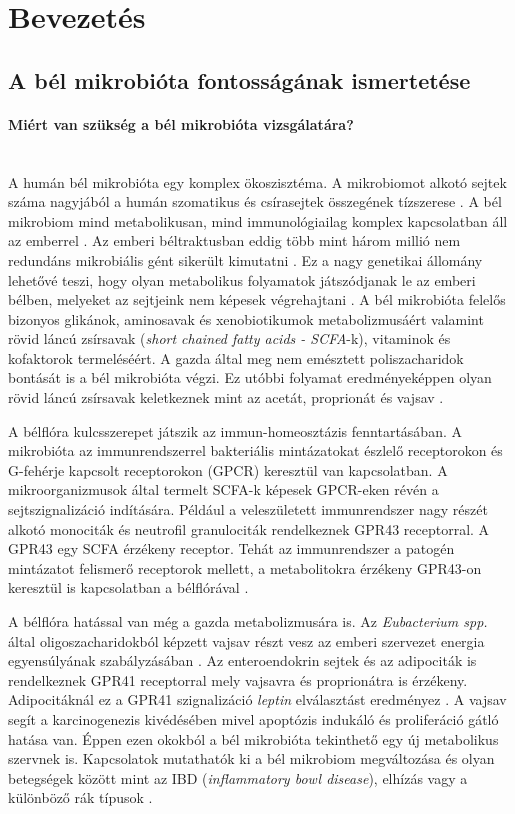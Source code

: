 \documentclass[a4paper,12pt]{article}
\begin{document}
		\pagebreak

\section{Bevezetés}
	\subsection{A bél mikrobióta fontosságának ismertetése}
		\paragraph{Miért van szükség a bél mikrobióta vizsgálatára?} \mbox{}\\
		A humán bél mikrobióta egy komplex ökoszisztéma. A mikrobiomot alkotó sejtek száma nagyjából a humán szomatikus és csírasejtek összegének tízszerese \cite{scfa_and_vitamine}.  A bél mikrobiom mind metabolikusan, mind immunológiailag komplex kapcsolatban áll az emberrel \cite{gut_microbiome}. Az emberi béltraktusban eddig több mint három millió nem redundáns mikrobiális gént sikerült kimutatni \cite{meta_omics}. Ez a nagy genetikai állomány lehetővé teszi, hogy olyan metabolikus folyamatok játszódjanak le az emberi bélben, melyeket az sejtjeink nem képesek végrehajtani \cite{gut_microbiome}. A bél mikrobióta felelős bizonyos glikánok, aminosavak és xenobiotikumok metabolizmusáért valamint rövid láncú zsírsavak (\textit{short chained fatty acids - SCFA}-k), vitaminok és kofaktorok termeléséért. A gazda által meg nem emésztett poliszacharidok bontását is a bél mikrobióta végzi. Ez utóbbi folyamat eredményeképpen olyan rövid láncú zsírsavak keletkeznek mint az acetát, proprionát és vajsav \cite{scfa_and_vitamine}.

		A bélflóra kulcsszerepet játszik az immun-homeosztázis fenntartásában. A mikrobióta az immunrendszerrel bakteriális mintázatokat észlelő receptorokon és G-fehérje kapcsolt receptorokon (GPCR) keresztül van kapcsolatban. A mikroorganizmusok által termelt SCFA-k képesek GPCR-eken révén a sejtszignalizáció indítására. Például a veleszületett immunrendszer nagy részét alkotó monociták és neutrofil granulociták rendelkeznek GPR43 receptorral. A GPR43 egy SCFA érzékeny receptor. Tehát az immunrendszer a patogén mintázatot felismerő receptorok mellett, a metabolitokra érzékeny GPR43-on keresztül is kapcsolatban a bélflórával \cite{buthyrate_immune}.

		A bélflóra hatással van még a gazda metabolizmusára is.  Az \textit{Eubacterium spp.} által oligoszacharidokból képzett vajsav részt vesz az emberi szervezet energia egyensúlyának szabályzásában \cite{gut_microbiome}. Az enteroendokrin sejtek és az adipociták is rendelkeznek GPR41 receptorral mely vajsavra és proprionátra is érzékeny. Adipocitáknál ez a GPR41 szignalizáció \textit{leptin} elválasztást eredményez \cite{buthyrate_immune}. A vajsav segít a karcinogenezis kivédésében mivel apoptózis indukáló és proliferáció gátló hatása van. Éppen ezen okokból a bél mikrobióta tekinthető egy új metabolikus szervnek is\cite{scfa_and_vitamine}. Kapcsolatok mutathatók ki a bél mikrobiom megváltozása és olyan betegségek között mint az IBD (\textit{inflammatory bowl disease}), elhízás vagy a különböző rák típusok \cite{gut_microbiome}.
\end{document}
